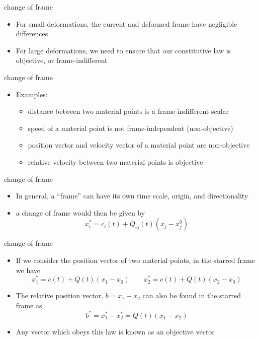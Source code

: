 \documentclass[
  letterpaper,
  ignorenonframetext,
  aspectratio=43,
  handout,
  12pt]{beamer}
\providecommand{\tightlist}{%
  \setlength{\itemsep}{0pt}\setlength{\parskip}{0pt}}
\providecommand{\tightlist}{%
\setlength{\itemsep}{0pt}\setlength{\parskip}{0pt}}
\begin{document}
\begin{frame}{change of frame}
\protect\hypertarget{change-of-frame}{}
\begin{itemize}
\tightlist
\item
  For small deformations, the current and deformed frame have negligible
  differences
\item
  For large deformations, we need to ensure that our constitutive law is
  objective, or frame-indifferent
\end{itemize}
\end{frame}

\begin{frame}{change of frame}
\protect\hypertarget{change-of-frame-1}{}
\begin{itemize}
\tightlist
\item
  Examples:

  \begin{itemize}
  \tightlist
  \item
    distance between two material points is a frame-indifferent scalar
  \item
    speed of a material point is not frame-independent (non-objective)
  \item
    position vector and velocity vector of a material point are
    non-objective
  \item
    relative velocity between two material points is objective
  \end{itemize}
\end{itemize}
\end{frame}

\begin{frame}{change of frame}
\protect\hypertarget{change-of-frame-2}{}
\begin{itemize}
\tightlist
\item
  In general, a ``frame'' can have its own time scale, origin, and
  directionality
\item
  a change of frame would then be given by
  \[x_i^* = c_i(t) + Q_{ij}(t)(x_j-x^{0}_j)\]
\end{itemize}
\end{frame}

\begin{frame}{change of frame}
\protect\hypertarget{change-of-frame-3}{}
\begin{itemize}
\item
  If we consider the position vector of two material points, in the
  starred frame we have
  \[x_1^* = c(t) + Q(t)(x_1-x_0) \qquad x_2^* = c(t) + Q(t)(x_2-x_0)\]
\item
  The relative position vector, \(b=x_1-x_2\) can also be found in the
  starred frame as \[b^* = x_1^*-x_2^* = Q(t)(x_1-x_2)\]
\item
  Any vector which obeys this law is known as an objective vector
\end{itemize}
\end{frame}
\end{document}
